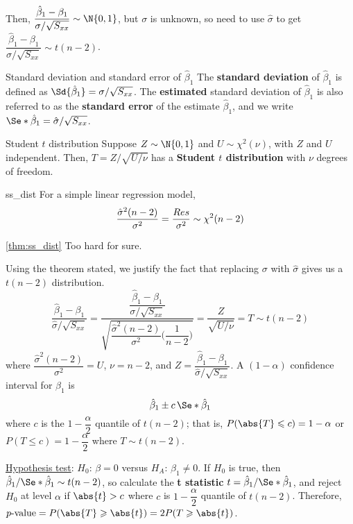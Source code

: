 Then, $ \dfrac{\hat{\beta}_1-\beta_1}{\sigma/\sqrt{S_{xx}}} \sim \N{0,1} $,
but $ \sigma $ is unknown, so need to use $ \hat{\sigma} $
to get
$ \dfrac{\hat{\beta}_1-\beta_1}{\hat{\sigma}/\sqrt{S_{xx}}}
  \sim t(n-2) $.
\begin{Definition}{Standard deviation and standard error of $ \hat{\beta}_1 $}{}
  The \textbf{standard deviation} of $ \hat{\beta}_1 $
  is defined as $ \Sd{\hat{\beta}_1}=\sigma/\sqrt{S_{xx}} $.
  The \textbf{estimated} standard deviation of $ \hat{\beta}_1 $
  is also referred to as the \textbf{standard error}
  of the estimate $ \hat{\beta}_1 $, and
  we write $ \Se*{\hat{\beta}_1}=\hat{\sigma}/\sqrt{S_{xx}} $.
\end{Definition}
\begin{Definition}{Student $ t $ distribution}{}
  Suppose $ Z \sim \N{0,1} $
  and $ U \sim \chi^2(\nu) $,
  with $ Z $ and $ U $ independent. Then,
  $ T=Z/\sqrt{U/\nu} $ has a \textbf{Student $t$ distribution}
  with $ \nu $ degrees of freedom.
\end{Definition}
\begin{Theorem}{}{ss_dist}
  For a simple linear regression model,
  \[ \frac{\hat{\sigma}^2(n-2)}{\sigma^2}=\frac{\relax{Res}}{\sigma^2}
    \sim \chi^2(n-2) \]
\end{Theorem}
\begin{Proof}{\ref{thm:ss_dist}}{}
  Too hard for sure.
\end{Proof}
Using the theorem stated, we justify
the fact that replacing $ \sigma $ with $ \hat{\sigma} $
gives us a $ t(n-2) $ distribution.
\[ \frac{\hat{\beta}_1-\beta_1}{\hat{\sigma}/\sqrt{S_{xx}}}
  =\dfrac{\dfrac{\hat{\beta}_1-\beta_1}{\sigma/\sqrt{S_{xx}}}}{
    \sqrt{\dfrac{\hat{\sigma}^2(n-2)}{\sigma^2}\biggl( \dfrac{1}{n-2} \biggr)}
  }=
  \frac{Z}{\sqrt{U/\nu}}=T \sim t(n-2)  \]
where $ \dfrac{\hat{\sigma}^2(n-2)}{\sigma^2}=U $,
$ \nu=n-2 $, and $ Z=\dfrac{\hat{\beta}_1-\beta_1}{\hat{\sigma}/\sqrt{S_{xx}}} $.
A $ (1-\alpha) $ confidence interval for $ \beta_1 $ is
\[ \hat{\beta}_1\pm c\,\Se*{\hat{\beta}_1} \]
where $ c $ is the $ 1-\dfrac{\alpha}{2} $ quantile
of $ t(n-2) $; that is,
$ P(\abs{T}\leqslant c)=1-\alpha $ or
$ P(T\leqslant c)=1-\dfrac{\alpha}{2} $
where $ T \sim t(n-2) $.

\underline{Hypothesis test}:
$ H_0 $: $ \beta=0 $ versus
$ H_A $: $ \beta_1\neq 0 $.
If $ H_0 $ is true, then $ \hat{\beta}_1/\Se*{\hat{\beta}_1} \sim t(n-2) $,
so calculate the \textbf{t statistic}
$ t=\hat{\beta}_1/\Se*{\hat{\beta}_1} $,
and reject $ H_0 $ at level $ \alpha $ if $ \abs{t}>c $
where $ c $ is $ 1-\dfrac{\alpha}{2} $ quantile of $ t(n-2) $.
Therefore,
$ p\text{-value}=P(\abs{T}\geqslant \abs{t})
  =2P(T\geqslant \abs{t}) $.

